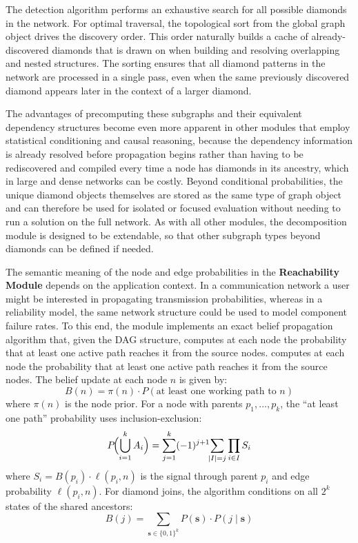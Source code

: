 \documentclass[twocolumn]{rps-esrel2026}
\begin{document}
The detection algorithm performs an exhaustive search for all possible diamonds in the network. For optimal traversal, the topological sort from the global graph object drives the discovery order. This order naturally builds a cache of already-discovered diamonds that is drawn on when building and resolving overlapping and nested structures. The sorting ensures that all diamond patterns in the network are processed in a single pass, even when the same previously discovered diamond appears later in the context of a larger diamond.

The advantages of precomputing these subgraphs and their equivalent dependency structures become even more apparent in other modules that employ statistical conditioning and causal reasoning, because the dependency information is already resolved before propagation begins rather than having to be rediscovered and compiled every time a node has diamonds in its ancestry, which in large and dense networks can be costly. Beyond conditional probabilities, the unique diamond objects themselves are stored as the same type of graph object and can therefore be used for isolated or focused evaluation without needing to run a solution on the full network. As with all other modules, the decomposition module is designed to be extendable, so that other subgraph types beyond diamonds can be defined if needed.

The semantic meaning of the node and edge probabilities in the \textbf{Reachability Module} depends on the application context. In a communication network a user might be interested in propagating transmission probabilities, whereas in a reliability model, the same network structure could be used to model component failure rates.  To this end, the module implements an exact belief propagation algorithm that, given the DAG structure, computes at each node the probability that at least one active path reaches it from the source nodes. 
computes at each node the probability that at least one active path reaches it from the source nodes. The belief update at each node $n$ is given by: 
\begin{equation}\label{eq:belief}
B(n) = \pi(n) \cdot P\!\left(\text{at least one working path to } n\right)
\end{equation}
where $\pi(n)$ is the node prior. For a node with parents $p_1, \ldots, p_k$, the ``at least one path'' probability uses inclusion-exclusion:
\begin{equation}\label{eq:inclexcl}
P\!\Bigl(\bigcup_{i=1}^{k} A_i\Bigr) = \sum_{j=1}^{k} (-1)^{j+1} \!\!\sum_{|I|=j} \prod_{i \in I} S_i
\end{equation}
where $S_i = B(p_i) \cdot \ell(p_i, n)$ is the signal through parent $p_i$ and edge probability $\ell(p_i, n)$. For diamond joins, the algorithm conditions on all $2^k$ states of the shared ancestors:
\begin{equation}\label{eq:diamond_cond}
B(j) = \sum_{\mathbf{s} \in \{0,1\}^k} P(\mathbf{s}) \cdot P(j \mid \mathbf{s})
\end{equation}
\end{document}
